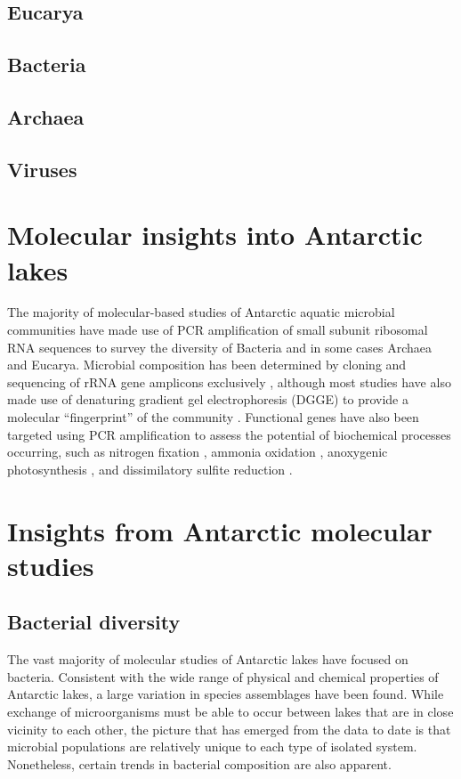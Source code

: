 \subsection{Eucarya}
\subsection{Bacteria}
\subsection{Archaea}
\subsection{Viruses}

\section{Molecular insights into Antarctic lakes}
\label{in:mol}
The majority of molecular-based studies of Antarctic aquatic microbial communities have made use of PCR amplification of small subunit ribosomal RNA sequences to survey the diversity of Bacteria
 and in some cases Archaea and Eucarya. %
Microbial composition has been determined by cloning and sequencing of rRNA gene amplicons exclusively 
\cite{Bowman2000a, Bowman2000, Gordon2000, Christner2001, Purdy2003, Karr2006, Matsuzaki2006, Kurosawa2010,Bielewicz2011}, 
although most studies have also made use of denaturing gradient gel electrophoresis (DGGE) to provide a molecular ``fingerprint'' of the community 
\cite{Pearce2003, Pearce2003, Karr2005, Pearce2005, Pearce2005, Unrein2005, Glatz2006, Mikucki2007, Mosier2007, Schiaffino2009, Villaescusa2010}.
Functional genes have also been targeted using PCR amplification to assess the potential of biochemical processes occurring, such as nitrogen fixation \cite{Olsen1998}, 
ammonia oxidation \cite{Voytek1999}, anoxygenic photosynthesis \cite{Karr2003}, and dissimilatory sulfite reduction \cite{Karr2005, Mikucki2009}. %

\section[Antarctic molecular studies]{Insights from Antarctic molecular studies}

\subsection{Bacterial diversity}
The vast majority of molecular studies of Antarctic lakes have focused on bacteria.
Consistent with the wide range of physical and chemical properties of Antarctic lakes, a large variation in species assemblages have been found.
While exchange of microorganisms must be able to occur between lakes that are in close vicinity to each other, 
the picture that has emerged from the data to date is that microbial populations are relatively unique to each type of isolated system. 
Nonetheless, certain trends in bacterial composition are also apparent.

